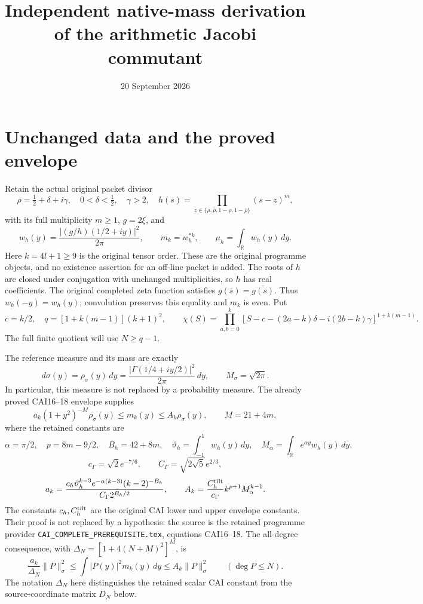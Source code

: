 \documentclass[11pt]{article}
\title{Independent native-mass derivation of the arithmetic Jacobi commutant}
\author{}
\date{20 September 2026}
\newcommand{\R}{\mathbb R}
\begin{document}
\maketitle

\section{Unchanged data and the proved envelope}

Retain the actual original packet divisor
\[
 \rho=\tfrac12+\delta+i\gamma,\quad 0<\delta<\tfrac12,\quad\gamma>2,
 \quad h(s)=\prod_{z\in\{\rho,\bar\rho,1-\rho,1-\bar\rho\}}(s-z)^m,
\]
with its full multiplicity $m\geq1$, $g=2\xi$, and
\[
 w_h(y)=\frac{|(g/h)(1/2+iy)|^2}{2\pi},\qquad
 m_k=w_h^{*k},\qquad \mu_h=\int_\R w_h(y)\,dy.
\]
Here $k=4l+1\geq9$ is the original tensor order. These are the
original programme objects, and no existence assertion for an
off-line packet is added. The roots of $h$ are closed under conjugation
with unchanged multiplicities, so $h$ has real coefficients. The
original completed zeta function satisfies
$g(\bar s)=\overline{g(s)}$. Thus $w_h(-y)=w_h(y)$; convolution
preserves this equality and $m_k$ is even. Put
\[
 c=k/2,\quad q=[1+k(m-1)](k+1)^2,\qquad
 \chi(S)=\prod_{a,b=0}^k
 [S-c-(2a-k)\delta-i(2b-k)\gamma]^{1+k(m-1)}.
\]
The full finite quotient will use $N\geq q-1$.

The reference measure and its mass are exactly
\[
 d\sigma(y)=\rho_\sigma(y)\,dy
 =\frac{|\Gamma(1/4+iy/2)|^2}{2\pi}\,dy,
 \qquad M_\sigma=\sqrt{2\pi}.
\]
In particular, this measure is not replaced by a probability measure.
The already proved CAI16--18 envelope supplies
\begin{equation}\label{eq:envelope}
 a_k(1+y^2)^{-M}\rho_\sigma(y)\leq m_k(y)
                       \leq A_k\rho_\sigma(y),\qquad M=21+4m,
\end{equation}
where the retained constants are
\[
 \alpha=\pi/2,\quad p=8m-9/2,\quad B_h=42+8m,\quad
 \vartheta_h=\int_{-1}^1w_h(y)\,dy,
 \quad M_\alpha=\int_\R e^{\alpha y}w_h(y)\,dy,
\]
\[
 c_\Gamma=\sqrt2e^{-7/6},\qquad C_\Gamma=\sqrt{2\sqrt5}e^{2/3},
\]
\[
 a_k=\frac{c_h\vartheta_h^{k-3}e^{-\alpha(k-3)}(k-2)^{-B_h}}
              {C_\Gamma2^{B_h/2}},\qquad
 A_k=\frac{C_h^{\rm tilt}}{c_\Gamma}k^{p+1}M_\alpha^{k-1}.
\]
The constants $c_h,C_h^{\rm tilt}$ are the original CAI lower and
upper envelope constants. Their proof is not replaced by a hypothesis:
the source is the retained programme provider
\texttt{CAI\_\allowbreak COMPLETE\_\allowbreak PREREQUISITE.tex},
equations CAI16--18.
The all-degree consequence, with
$\Delta_N=[1+4(N+M)^2]^M$, is
\begin{equation}\label{eq:finite-envelope}
 \frac{a_k}{\Delta_N}\|P\|_\sigma^2
       \leq\int|P(y)|^2m_k(y)\,dy\leq A_k\|P\|_\sigma^2
       \qquad(\deg P\leq N).
\end{equation}
The notation $\Delta_N$ here distinguishes the retained scalar CAI
constant from the source-coordinate matrix $D_N$ below.
\end{document}

